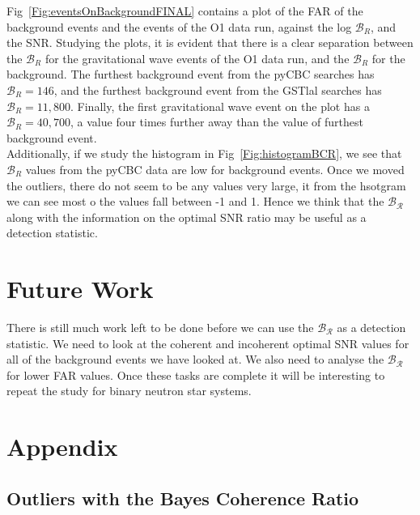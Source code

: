 \documentclass{article}
\begin{document}
    
  
  
  Fig~\ref{Fig:eventsOnBackgroundFINAL} contains a plot of the FAR of the background events and the events of the O1 data run, against the log  $\mathcal{B}_{R}$, and the SNR. Studying the plots, it is evident that there is a clear separation between the $\mathcal{B}_{R}$ for the gravitational wave events of the O1 data run, and the $\mathcal{B}_{R}$ for the background. The furthest background event from the pyCBC searches has $\mathcal{B}_{R} = 146$, and the furthest background event from the GSTlal searches has $\mathcal{B}_{R} = 11,800 $. Finally, the first gravitational wave event on the plot has a $\mathcal{B}_{R}= 40,700$, a value four times further away than the value of furthest background event. \\
  
  Additionally, if we study the histogram in Fig~\ref{Fig:histogramBCR}, we see that $\mathcal{B}_{R}$ values from the pyCBC data are low for background events. Once we moved the outliers, there do not seem to be any values very large, it from the hsotgram we can see most o the values fall between -1 and 1. Hence we think that the $\mathcal{B_{R}}$ along with the information on the optimal SNR ratio may be useful as a detection statistic.
  
  
 
 
 
 \section{Future Work }
There is still much work left to be done before we can use the $\mathcal{B_{R}}$ as a detection statistic. We need to look at the coherent and incoherent optimal SNR values for all of the background events we have looked at. We also need to analyse the $\mathcal{B_{R}}$ for lower FAR values. Once these tasks are complete it will be interesting to repeat the study for binary neutron star systems. 

   
   \section{Appendix}
  
 
 \subsection{Outliers with the Bayes Coherence Ratio}
 
\end{document}
